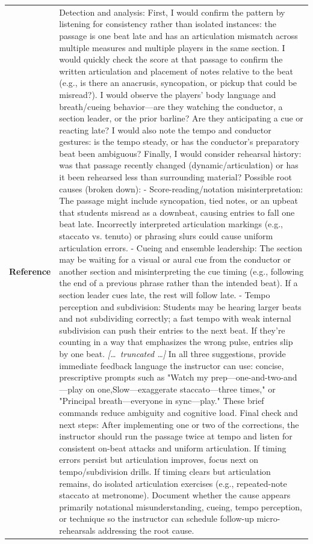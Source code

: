 \begin{longtable}{@{}l p{12.5cm}@{}}
  \textbf{Reference} & Detection and analysis: \newline First, I would confirm the pattern by listening for consistency rather than isolated instances: the passage is one beat late and has an articulation mismatch across multiple measures and multiple players in the same section. I would quickly check the score at that passage to confirm the written articulation and placement of notes relative to the beat (e.g., is there an anacrusis, syncopation, or pickup that could be misread?). I would observe the players' body language and breath/cueing behavior---are they watching the conductor, a section leader, or the prior barline? Are they anticipating a cue or reacting late? I would also note the tempo and conductor gestures: is the tempo steady, or has the conductor's preparatory beat been ambiguous? Finally, I would consider rehearsal history: was that passage recently changed (dynamic/articulation) or has it been rehearsed less than surrounding material? \newline Possible root causes (broken down): \newline - Score-reading/notation misinterpretation: The passage might include syncopation, tied notes, or an upbeat that students misread as a downbeat, causing entries to fall one beat late. Incorrectly interpreted articulation markings (e.g., staccato vs. tenuto) or phrasing slurs could cause uniform articulation errors. \newline - Cueing and ensemble leadership: The section may be waiting for a visual or aural cue from the conductor or another section and misinterpreting the cue timing (e.g., following the end of a previous phrase rather than the intended beat). If a section leader cues late, the rest will follow late. \newline - Tempo perception and subdivision: Students may be hearing larger beats and not subdividing correctly; a fast tempo with weak internal subdivision can push their entries to the next beat. If they're counting in a way that emphasizes the wrong pulse, entries slip by one beat. \newline \textit{[\ldots\ truncated \ldots]} \newline In all three suggestions, provide immediate feedback language the instructor can use: concise, prescriptive prompts such as "Watch my prep---one-and-two-and---play on one,Slow---exaggerate staccato---three times," or "Principal breath---everyone in sync---play." These brief commands reduce ambiguity and cognitive load. \newline Final check and next steps: After implementing one or two of the corrections, the instructor should run the passage twice at tempo and listen for consistent on-beat attacks and uniform articulation. If timing errors persist but articulation improves, focus next on tempo/subdivision drills. If timing clears but articulation remains, do isolated articulation exercises (e.g., repeated-note staccato at metronome). Document whether the cause appears primarily notational misunderstanding, cueing, tempo perception, or technique so the instructor can schedule follow-up micro-rehearsals addressing the root cause. \\

\end{longtable}
